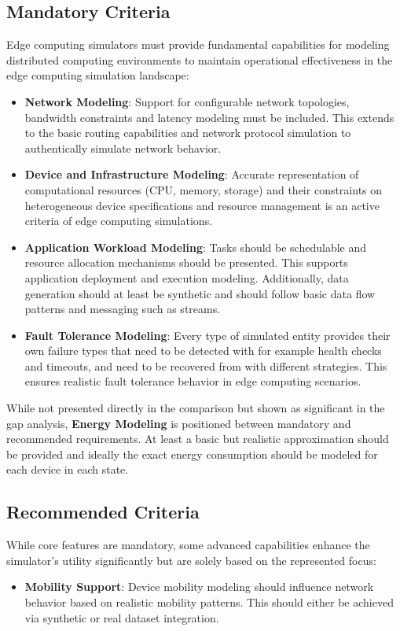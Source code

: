 \subsection{Mandatory Criteria}
Edge computing simulators must provide fundamental capabilities for modeling distributed computing environments to maintain operational effectiveness in the edge computing simulation landscape:
\begin{itemize}
  \item \textbf{Network Modeling}:
        Support for configurable network topologies, bandwidth constraints and latency modeling must be included.
        This extends to the basic routing capabilities and network protocol simulation to authentically simulate network behavior.
  \item \textbf{Device and Infrastructure Modeling}:
        Accurate representation of computational resources (CPU, memory, storage) and their constraints on heterogeneous device specifications and resource management is 
        an active criteria of edge computing simulations.
  \item \textbf{Application Workload Modeling}:
        Tasks should be schedulable and resource allocation mechanisms should be presented.
        This supports application deployment and execution modeling.
        Additionally, data generation should at least be synthetic and should follow basic data flow patterns and messaging such as streams.
  \item \textbf{Fault Tolerance Modeling}:
        Every type of simulated entity provides their own failure types that need to be detected with for example health checks and timeouts, and need to be recovered from with different strategies.
        This ensures realistic fault tolerance behavior in edge computing scenarios.
\end{itemize}

While not presented directly in the comparison but shown as significant in the gap analysis, \textbf{Energy Modeling} is positioned between mandatory and recommended requirements.
At least a basic but realistic approximation should be provided and ideally the exact energy consumption should be modeled for each device in each state.

\subsection{Recommended Criteria}
While core features are mandatory, some advanced capabilities enhance the simulator's utility significantly but are solely based on the represented focus:
\begin{itemize}
  \item \textbf{Mobility Support}:
        Device mobility modeling should influence network behavior based on realistic mobility patterns.
        This should either be achieved via synthetic or real dataset integration.
\end{itemize}

